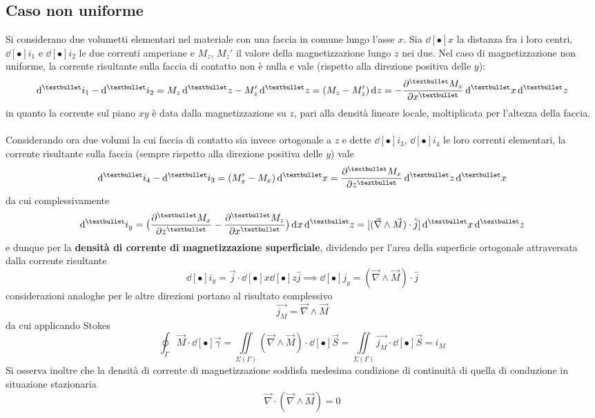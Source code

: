\subsection{Caso non uniforme}
Si considerano due volumetti elementari nel materiale con una faccia in comune lungo l'asse $x$. Sia $\dd[•]{x}$ la distanza fra i loro centri, $\dd[•]{i_1}$ e $\dd[•]{i_2}$ le due correnti amperiane e $M_z$, $M_z'$ il valore della magnetizzazione lungo $z$ nei due. Nel caso di magnetizzazione non uniforme, la corrente risultante sulla faccia di contatto non è nulla e vale (rispetto alla direzione positiva delle $y$):
\[\dd[•]{i_1} - \dd[•]{i_2} = M_z \dd[•]{z} - M_z ' \dd[•]{z} = (M_z - M_z') \dd[]{z} = - \pdv[•]{M_z}{x} \dd[•]{x}\dd[•]{z}\]
in quanto la corrente sul piano $xy$ è data dalla magnetizzazione su $z$, pari alla densità lineare locale, moltiplicata per l'altezza della faccia.
\\~\\
Considerando ora due volumi la cui faccia di contatto sia invece ortogonale a $z$ e dette $\dd[•]{i_3}$, $\dd[•]{i_4}$ le loro correnti elementari, la corrente risultante sulla faccia (sempre rispetto alla direzione positiva delle $y$) vale
\[\dd[•]{i_4} - \dd[•]{i_3} = (M_x' - M_x) \dd[•]{x} = \pdv[•]{M_x}{z} \dd[•]{z} \dd[•]{x}\]
da cui complessivamente
\[\dd[•]{i_y} = \big(\pdv[•]{M_x}{z} - \pdv[•]{M_z}{x}\big) \dd[]{x} \dd[•]{z} = [(\vec{\nabla} \wedge \vec{M}) \cdot \hat{j}] \dd[•]{x} \dd[•]{z}\]
e dunque per la \textbf{densità di corrente di magnetizzazione superficiale}, dividendo per l'area della superficie ortogonale attraversata dalla corrente risultante
\[\dd[•]{i_y} = \vec{j} \cdot \dd[•]{x} \dd[•]{z}\hat{j} \implies \dd[•]{j_y} = (\vec{\nabla} \wedge \vec{M}) \cdot \hat{j}\]
considerazioni analoghe per le altre direzioni portano al risultato complessivo
\[\vec{j_M} = \vec{\nabla} \wedge \vec{M}\]
da cui applicando Stokes
\[\oint_\Gamma \vec{M} \cdot \dd[•]{\vec{\gamma}} = \iint\limits_{\Sigma(\Gamma)} (\vec{\nabla} \wedge \vec{M}) \cdot \dd[•]{\vec{S}} = \iint\limits_{\Sigma(\Gamma)} \vec{j_M} \cdot \dd[•]{\vec{S}} = i_M\]
Si osserva inoltre che la densità di corrente di magnetizzazione soddisfa medesima condizione di continuità di quella di conduzione in situazione stazionaria
\[\vec{\nabla} \cdot (\vec{\nabla} \wedge \vec{M}) = 0\]

